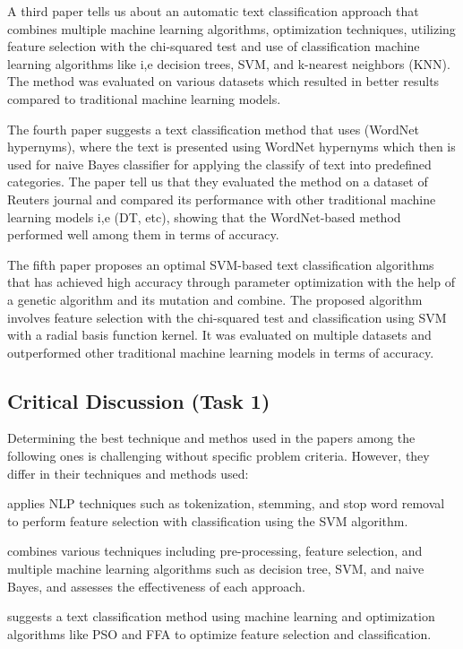 \documentclass[11pt,a4paper]{article}
\begin{document}
A third paper \cite{3} tells us about an automatic text classification approach that combines multiple machine learning algorithms, optimization techniques, utilizing feature selection with the chi-squared test and use of classification  machine learning algorithms like i,e decision trees, SVM, and k-nearest neighbors (KNN). The method was evaluated on various datasets which resulted in better results compared to traditional machine learning models.

The fourth paper \cite{4} suggests a text classification method that uses (WordNet hypernyms), where the text is presented using WordNet hypernyms which then is used for naive Bayes classifier for applying the classify of text into predefined categories. The paper tell us that they evaluated the method on a dataset of Reuters journal and compared its performance with other traditional machine learning models i,e (DT, etc), showing that the WordNet-based method performed well among them in terms of accuracy.

The fifth paper \cite{5} proposes an optimal SVM-based text classification algorithms that has achieved high accuracy through parameter optimization with the help of a genetic algorithm and its mutation and combine. The proposed algorithm involves feature selection with the chi-squared test and classification using SVM with a radial basis function kernel. It was evaluated on multiple datasets and outperformed other traditional machine learning models in terms of accuracy.

\subsection{Critical Discussion (Task 1)}
Determining the best technique and methos used in the papers among the following ones is challenging without specific problem criteria. However, they differ in their techniques and methods used:

\cite{1} applies NLP techniques such as tokenization, stemming, and stop word removal to perform feature selection with classification using the SVM algorithm.

\cite{2} combines various techniques including pre-processing, feature selection, and multiple machine learning algorithms such as decision tree, SVM, and naive Bayes, and assesses the effectiveness of each approach.

\cite{3} suggests a text classification method using machine learning and optimization algorithms like PSO and FFA to optimize feature selection and classification.
\end{document}
